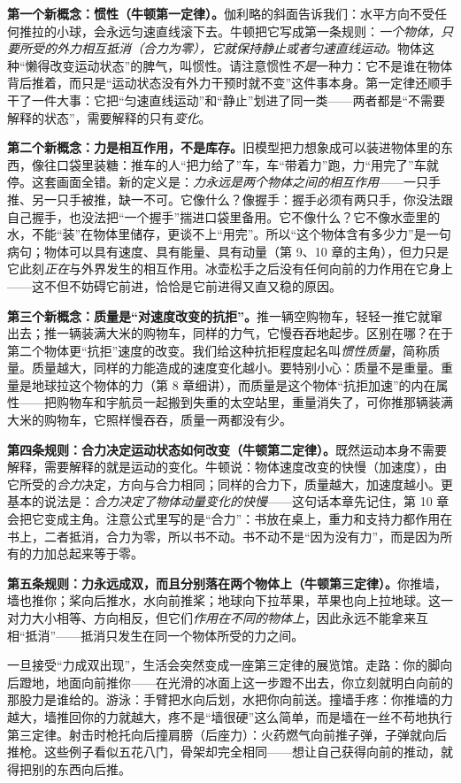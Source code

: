 \begin{mainline}
\textbf{第一个新概念：惯性（牛顿第一定律）。}伽利略的斜面告诉我们：水平方向不受任何推拉的小球，会永远匀速直线滚下去。牛顿把它写成第一条规则：\emph{一个物体，只要所受的外力相互抵消（合力为零），它就保持静止或者匀速直线运动。}物体这种“懒得改变运动状态”的脾气，叫惯性。请注意惯性\emph{不是}一种力：它不是谁在物体背后推着，而只是“运动状态没有外力干预时就不变”这件事本身。第一定律还顺手干了一件大事：它把“匀速直线运动”和“静止”划进了同一类——两者都是“不需要解释的状态”，需要解释的只有\emph{变化}。

\textbf{第二个新概念：力是相互作用，不是库存。}旧模型把力想象成可以装进物体里的东西，像往口袋里装糖：推车的人“把力给了”车，车“带着力”跑，力“用完了”车就停。这套画面全错。新的定义是：\emph{力永远是两个物体之间的相互作用}——一只手推、另一只手被推，缺一不可。它像什么？像握手：握手必须有两只手，你没法跟自己握手，也没法把“一个握手”揣进口袋里备用。它不像什么？它不像水壶里的水，不能“装”在物体里储存，更谈不上“用完”。所以“这个物体含有多少力”是一句病句；物体可以具有速度、具有能量、具有动量（第 9、10 章的主角），但力只是它此刻\emph{正在}与外界发生的相互作用。冰壶松手之后没有任何向前的力作用在它身上——这不但不妨碍它前进，恰恰是它前进得又直又稳的原因。

\textbf{第三个新概念：质量是“对速度改变的抗拒”。}推一辆空购物车，轻轻一推它就窜出去；推一辆装满大米的购物车，同样的力气，它慢吞吞地起步。区别在哪？在于第二个物体更“抗拒”速度的改变。我们给这种抗拒程度起名叫\emph{惯性质量}，简称质量。质量越大，同样的力能造成的速度变化越小。要特别小心：质量不是重量。重量是地球拉这个物体的力（第 8 章细讲），而质量是这个物体“抗拒加速”的内在属性——把购物车和宇航员一起搬到失重的太空站里，重量消失了，可你推那辆装满大米的购物车，它照样慢吞吞，质量一两都没有少。

\textbf{第四条规则：合力决定运动状态如何改变（牛顿第二定律）。}既然运动本身不需要解释，需要解释的就是运动的变化。牛顿说：物体速度改变的快慢（加速度），由它所受的\emph{合力}决定，方向与合力相同；同样的合力下，质量越大，加速度越小。更基本的说法是：\emph{合力决定了物体动量变化的快慢}——这句话本章先记住，第 10 章会把它变成主角。注意公式里写的是“合力”：书放在桌上，重力和支持力都作用在书上，二者抵消，合力为零，所以书不动。书不动不是“因为没有力”，而是因为所有的力加总起来等于零。

\textbf{第五条规则：力永远成双，而且分别落在两个物体上（牛顿第三定律）。}你推墙，墙也推你；桨向后推水，水向前推桨；地球向下拉苹果，苹果也向上拉地球。这一对力大小相等、方向相反，但它们\emph{作用在不同的物体上}，因此永远不能拿来互相“抵消”——抵消只发生在同一个物体所受的力之间。

一旦接受“力成双出现”，生活会突然变成一座第三定律的展览馆。走路：你的脚向后蹬地，地面向前推你——在光滑的冰面上这一步蹬不出去，你立刻就明白向前的那股力是谁给的。游泳：手臂把水向后划，水把你向前送。撞墙手疼：你推墙的力越大，墙推回你的力就越大，疼不是“墙很硬”这么简单，而是墙在一丝不苟地执行第三定律。射击时枪托向后撞肩膀（后座力）：火药燃气向前推子弹，子弹就向后推枪。这些例子看似五花八门，骨架却完全相同——想让自己获得向前的推动，就得把别的东西向后推。
\end{mainline}


